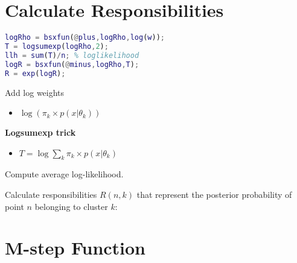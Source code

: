 \documentclass[11pt]{article}
\begin{document}
\vspace{0.5cm}

\section{Calculate Responsibilities}

\begin{minipage}{\textwidth}
\begin{minipage}[t]{0.48\textwidth}
\begin{lstlisting}[language=Matlab, firstnumber=99]
logRho = bsxfun(@plus,logRho,log(w));
T = logsumexp(logRho,2);
llh = sum(T)/n; % loglikelihood
logR = bsxfun(@minus,logRho,T);
R = exp(logR);
\end{lstlisting}
\end{minipage}
\hfill
\begin{minipage}[t]{0.48\textwidth}

Add log weights
\begin{itemize}
\item $\log(\pi_k \times p(x|\theta_k))$
\end{itemize}

\textbf{Logsumexp trick}
\begin{itemize}
\item $T = \log \sum_k \pi_k \times p(x|\theta_k)$
\end{itemize}

Compute average log-likelihood.

Calculate responsibilities $R(n,k)$ that represent the posterior probability of point $n$ belonging to cluster $k$:
\end{minipage}
\end{minipage}

\vspace{0.5cm}

\section{M-step Function}
\end{document}
